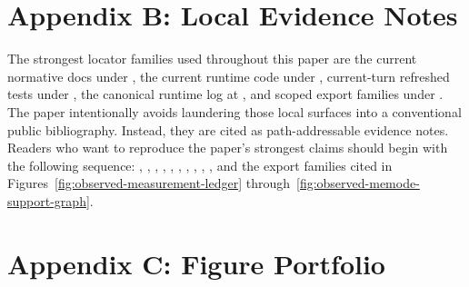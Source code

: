 \documentclass[10pt]{article}
\begin{document}
\section{Appendix B: Local Evidence Notes}

The strongest locator families used throughout this paper are the current normative docs under , the current runtime code under , current-turn refreshed tests under , the canonical runtime log at , and scoped export families under . The paper intentionally avoids laundering those local surfaces into a conventional public bibliography. Instead, they are cited as path-addressable evidence notes. Readers who want to reproduce the paper's strongest claims should begin with the following sequence: , , , , , , , , , , and the export families cited in Figures~\ref{fig:observed-measurement-ledger} through~\ref{fig:observed-memode-support-graph}.

\section{Appendix C: Figure Portfolio}


\end{document}
